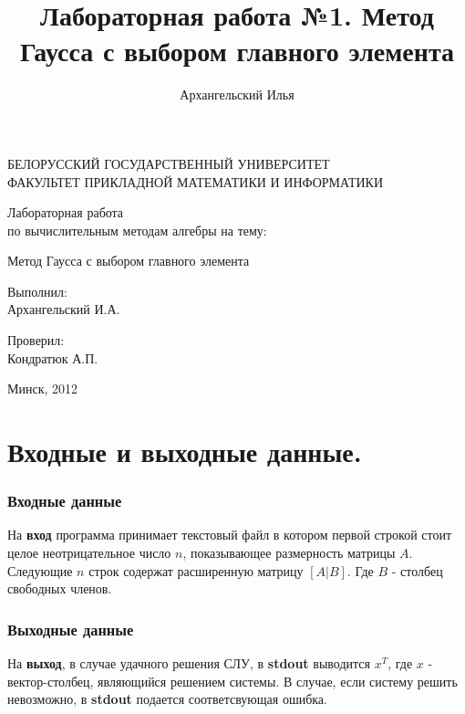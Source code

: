 \documentclass[a4paper,11pt]{article}
\title{Лабораторная работа №1. Метод Гаусса с выбором главного элемента}
\author{Архангельский Илья}
\begin{document}
\begin{titlepage}
	\begin{center}
		БЕЛОРУССКИЙ ГОСУДАРСТВЕННЫЙ УНИВЕРСИТЕТ \\
		ФАКУЛЬТЕТ ПРИКЛАДНОЙ МАТЕМАТИКИ И ИНФОРМАТИКИ
	\end{center}
	\vspace{10em}
	\begin{center}
		\LARGE {Лабораторная работа \\
		по вычислительным методам алгебры на тему:}
		\linebreak	 
		
		Метод Гаусса с выбором главного элемента
	\end{center}
	\vspace{3em}
	\begin{flushright}
	  
	
 	Выполнил: \\	Архангельский И.А. \\ 
 	
 	  \vspace{1em}
 	
 	  Проверил: \\ Кондратюк А.П. \\
 	
	\end{flushright}
	
	\vfill
	\begin{center}
		Минск, 2012
	\end{center}
\end{titlepage} 

\newpage
\part{Входные и выходные данные.} 
\section*{Входные данные}
На \textbf{вход} программа принимает текстовый файл в котором первой строкой стоит целое неотрицательное число $n$, показывающее размерность матрицы $A$. Следующие $n$ строк содержат расширенную матрицу $[A|B]$. Где $B$ - столбец свободных членов.
\section*{Выходные данные}
На \textbf{выход}, в случае удачного решения СЛУ, в \textbf{stdout} выводится $x^T$, где $x$ - вектор-столбец, являющийся решением системы.  В случае, если систему решить невозможно, в \textbf{stdout} подается соответсвующая ошибка.
\newpage
\end{document}
